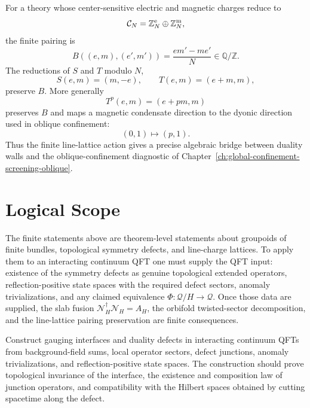 \begin{example}
\label{ex:finite-center-line-lattice-duality-wall}
For a theory whose center-sensitive electric and magnetic charges reduce to
\[
  \mathcal C_N=\mathbb Z_N^{\rm e}\oplus\mathbb Z_N^{\rm m},
\]
the finite pairing is
\[
  B((e,m),(e',m'))=\frac{em'-me'}{N}\in\mathbb Q/\mathbb Z.
\]
The reductions of \(S\) and \(T\) modulo \(N\),
\[
  S(e,m)=(m,-e),\qquad T(e,m)=(e+m,m),
\]
preserve \(B\).  More generally
\[
  T^p(e,m)=(e+pm,m)
\]
preserves \(B\) and maps a magnetic condensate direction to the dyonic
direction used in oblique confinement:
\[
  (0,1)\mapsto(p,1).
\]
Thus the finite line-lattice action gives a precise algebraic bridge between
duality walls and the oblique-confinement diagnostic of
Chapter~\ref{ch:global-confinement-screening-oblique}.
\end{example}

\section{Logical Scope}

The finite statements above are theorem-level statements about groupoids of
finite bundles, topological symmetry defects, and line-charge lattices.  To
apply them to an interacting continuum QFT one must supply the QFT input:
existence of the symmetry defects as genuine topological extended operators,
reflection-positive state spaces with the required defect sectors, anomaly
trivializations, and any claimed equivalence \(\Phi:\mathcal Q/H\to\mathcal
Q\).  Once those data are supplied, the slab fusion
\(\mathcal N_H^\dagger\mathcal N_H=A_H\), the orbifold twisted-sector
decomposition, and the line-lattice pairing preservation are finite
consequences.

\begin{openproblem}
\label{op:continuum-gauging-interfaces}
Construct gauging interfaces and duality defects in interacting continuum QFTs
from background-field sums, local operator sectors, defect junctions, anomaly
trivializations, and reflection-positive state spaces.  The construction
should prove topological invariance of the interface, the existence and
composition law of junction operators, and compatibility with the Hilbert
spaces obtained by cutting spacetime along the defect.
\end{openproblem}
